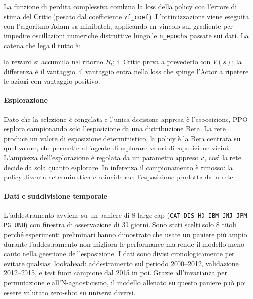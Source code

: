 La funzione di perdita complessiva combina la loss della policy con l'errore di stima del Critic (pesato dal coefficiente \lstinline{vf_coef}). 
L'ottimizzazione viene  eseguita con l'algoritmo Adam su minibatch, applicando un vincolo sul gradiente per impedire oscillazioni numeriche distruttive lungo le \lstinline{n_epochs} passate sui dati.
La catena che lega il tutto è: 
 
la reward si accumula nel ritorno $R_t$; il Critic prova a prevederlo con $V(s)$; la differenza è il vantaggio; il vantaggio entra nella loss che spinge l'Actor a ripetere le azioni con vantaggio positivo.

\paragraph{Esplorazione}
Dato che la selezione è congelata e l'unica decisione appresa è l'esposizione, PPO
esplora campionando solo l'esposizione da una distribuzione Beta.
La rete produce un valore di esposizione deterministico, la policy è la Beta centrata su quel valore, che permette all'agente di esplorare valori di esposizione vicini.
L'ampiezza dell'esplorazione è regolata da un parametro appreso $\kappa$, così la rete decide da sola quanto esplorare.
In inferenza il campionamento è rimosso: la policy diventa deterministica e coincide con l'esposizione prodotta dalla rete.

\paragraph{Dati e suddivisione temporale}
L'addestramento avviene su un paniere di 8 large-cap
(\lstinline{CAT DIS HD IBM JNJ JPM PG UNH}) con finestra di osservazione di 30
giorni. 
Sono stati scelti solo 8 titoli perché esperimenti preliminari hanno dimostrato che usare un paniere più ampio durante l'addestramento non migliora le performance ma rende il modello meno cauto nella geestione dell'esposizione. 
 I dati sono divisi cronologicamente per evitare qualsiasi lookahead:
addestramento sul periodo 2000--2012, validazione 2012--2015, e test fuori campione dal 2015 in poi. Grazie all'invarianza per permutazione e
all'N-agnosticismo, il modello allenato su questo paniere può poi essere valutato
zero-shot su universi diversi.

